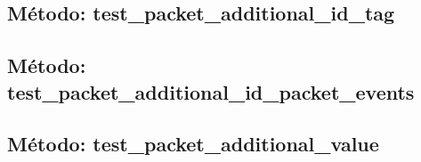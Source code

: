 

\subsection{\quad Método: test\_packet\_additional\_id\_tag}



\subsection{\quad Método: test\_packet\_additional\_id\_packet\_events}



\subsection{\quad Método: test\_packet\_additional\_value}


